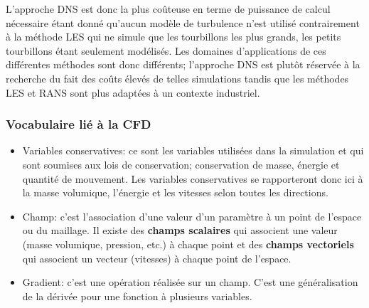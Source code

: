 L'approche DNS est donc la plus coûteuse en terme de puissance de calcul nécessaire étant donné qu'aucun modèle de turbulence n'est utilisé contrairement à la méthode LES qui ne simule que les tourbillons les plus grands, les petits tourbillons étant seulement modélisés. Les domaines d'applications de ces différentes méthodes sont donc différents; l'approche DNS est plutôt réservée à la recherche du fait des coûts élevés de telles simulations tandis que les méthodes LES et RANS sont plus adaptées à un contexte industriel.


\subsubsection{Vocabulaire lié à la CFD}

\begin{itemize}
\item Variables conservatives: ce sont les variables utilisées dans la simulation et qui sont soumises aux lois de conservation; conservation de masse, énergie et quantité de mouvement. Les variables conservatives se rapporteront donc ici à la masse volumique, l'énergie et les vitesses selon toutes les directions.
\item Champ: c'est l'association d'une valeur d'un paramètre à un point de l'espace ou du maillage. Il existe des \textbf{champs scalaires} qui associent une valeur (masse volumique, pression, etc.) à chaque point et des \textbf{champs vectoriels} qui associent un vecteur (vitesses) à chaque point de l'espace.
\item Gradient: c'est une opération réalisée sur un champ. C'est une généralisation de la dérivée pour une fonction à plusieurs variables.

\end{itemize}
